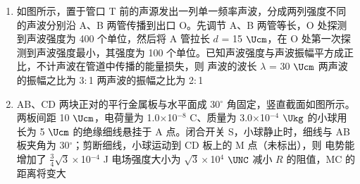 \documentclass[\gkver]{gaokaozhenti}
\begin{document}
\begin{enumerate}
{故选 C。
}

\item
如图所示，置于管口 T 前的声源发出一列单一频率声波，分成两列强度不同的声波分别沿 A、B 两管传播到出口 O。先调节 A、B 两管等长，O 处探测到声波强度为 400 个单位，然后将 A 管拉长 $d$ = 15 $\Ucm$，在 O 处第一次探测到声波强度最小，其强度为 100 个单位。已知声波强度与声波振幅平方成正比，不计声波在管道中传播的能量损失，则
{声波的波长 $\lambda$ = 30 $\Ucm$}
{两声波的振幅之比为 3$:$1}
{两声波的振幅之比为 2$:$1}

\item
AB、CD 两块正对的平行金属板与水平面成 30${^\circ}$ 角固定，竖直截面如图所示。两板间距 10 $\Ucm$，电荷量为 1.0$\times$10$^{-8}$ C、质量为 3.0$\times$10$^{-4}$ $\Ukg$ 的小球用长为 5 $\Ucm$ 的绝缘细线悬挂于 A 点。闭合开关 S，小球静止时，细线与 AB 板夹角为 30${^\circ}$；剪断细线，小球运动到 CD 板上的 M 点（未标出），则
{电势能增加了 $\frac{3}{4}\sqrt 3 \times$10$^{-4}$ J}
{电场强度大小为 $\sqrt 3 \times$10$^{4}$ $\UNC$}
{减小 $R$ 的阻值，MC 的距离将变大}
\end{enumerate}
\end{document}
